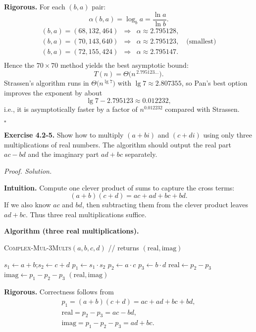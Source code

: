 \documentclass[12pt]{article}
\theoremstyle{definition}
\begin{document}
\noindent\textbf{Rigorous.}
For each $(b,a)$ pair:
\[
\alpha(b,a)=\log_b a=\frac{\ln a}{\ln b}.
\]
\[
\begin{array}{rcll}
(b,a)=(68,132{,}464) &\Rightarrow& \alpha \approx 2.795128,\\[2pt]
(b,a)=(70,143{,}640) &\Rightarrow& \alpha \approx \mathbf{2.795123},\quad\text{(smallest)}\\[2pt]
(b,a)=(72,155{,}424) &\Rightarrow& \alpha \approx 2.795147.\\
\end{array}
\]
Hence the $70\times70$ method yields the best asymptotic bound:
\[
T(n)=\Theta\!\big(n^{\,2.795123\ldots}\big).
\]
Strassen’s algorithm runs in $\Theta\!\big(n^{\lg 7}\big)$ with $\lg 7\approx 2.807355$,
so Pan’s best option improves the exponent by about
\[
\lg 7 - 2.795123 \approx 0.012232,
\]
i.e., it is asymptotically faster by a factor of $n^{0.012232}$ compared with Strassen.

\hfill$\square$

\newpage

\noindent\textbf{Exercise 4.2-5.}
Show how to multiply $(a+bi)$ and $(c+di)$ using only three multiplications of real numbers.
The algorithm should output the real part $ac-bd$ and the imaginary part $ad+bc$ separately.

\medskip
\noindent\textit{Proof. Solution.}

\noindent\textbf{Intuition.}
Compute one clever product of sums to capture the cross terms:
\[
(a+b)(c+d)=ac+ad+bc+bd.
\]
If we also know $ac$ and $bd$, then subtracting them from the clever product leaves $ad+bc$.
Thus three real multiplications suffice.

\noindent\textbf{Algorithm (three real multiplications).}
\begin{algorithm}[H]
\caption{\textsc{Complex-Mul-3Mults}$(a,b,c,d)$ \quad // returns $(\text{real},\text{imag})$}
\begin{algorithmic}[1]
\State $s_1 \gets a+b$;\quad $s_2 \gets c+d$
\State $p_1 \gets s_1 \cdot s_2$ 
\State $p_2 \gets a\cdot c$
\State $p_3 \gets b\cdot d$
\State $\text{real} \gets p_2 - p_3$ 
\State $\text{imag} \gets p_1 - p_2 - p_3$ 
\State \Return $(\text{real},\text{imag})$
\end{algorithmic}
\end{algorithm}

\noindent\textbf{Rigorous.}
Correctness follows from
\begin{align}
p_1=(a+b)(c+d)=ac+ad+bc+bd,\\
\text{real}=p_2-p_3=ac-bd,\\
\text{imag}=p_1-p_2-p_3=ad+bc.
\end{align}
\end{document}

